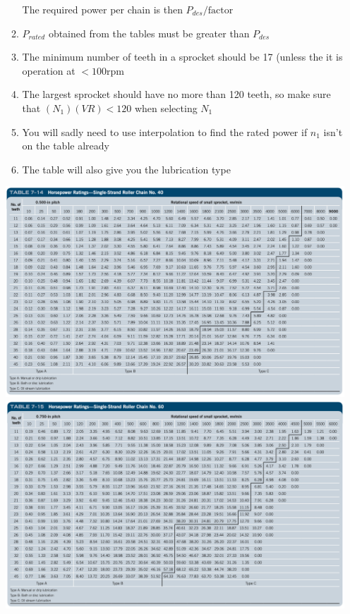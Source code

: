 \documentclass[11pt, fleqn]{article}
\begin{document}
\begin{enumerate}
\begin{enumerate}
        The required power per chain is then $P_{des}/\text{factor}$
        \item $P_{rated}$ obtained from the tables must be greater than $P_{des}$
        \item The minimum number of teeth in a sprocket should be 17 (unless the it is operation at $<100\text{rpm}$
        \item The largest sprocket should have no more than 120 teeth, so make sure that $(N_1)(VR) < 120$ when selecting $N_1$
        \item You will sadly need to use interpolation to find the rated power if $n_1$ isn't on the table already
        \item The table will also give you the lubrication type
    \end{enumerate}
    \includegraphics[scale=0.45]{Belts/7-14.png}\\
    \includegraphics[scale=0.45]{Belts/7-15.png}\\

\end{enumerate}
\end{document}
